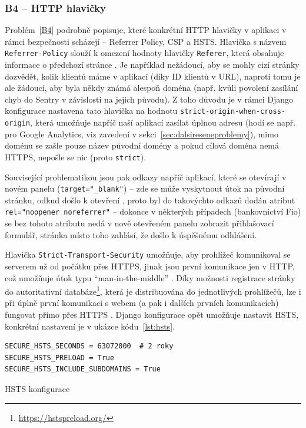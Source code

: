 \subsubsection{B4 -- HTTP hlavičky}

Problém~\ref{B4} podrobně popisuje, které konkrétní HTTP hlavičky v aplikaci v rámci bezpečnosti scházejí -- Referrer Policy, CSP a HSTS. Hlavička s názvem \verb|Referrer-Policy| slouží k omezení hodnoty hlavičky \verb|Referer|, která obsahuje informace o předchozí stránce \cite{securityheaders-referer}. Je například nežádoucí, aby se mohly cizí stránky dozvědět, kolik klientů máme v aplikací (díky ID klientů v URL), naproti tomu je ale žádoucí, aby byla někdy známá alespoň doména (např. kvůli povolení zasílání chyb do Sentry v závislosti na jejich původu). Z toho důvodu je v rámci Django konfigurace nastavena tato hlavička na hodnotu \verb|strict-origin-when-cross-origin|, která umožňuje napříč naší aplikací zasílat úplnou adresu (hodí se např. pro Google Analytics, viz zavedení v sekci~\ref{sec:dalsireseneproblemy}), mimo doménu se zašle pouze název původní domény a pokud cílová doména nemá HTTPS, nepošle se nic (proto \verb|strict|). 

Související problematikou jsou pak odkazy napříč aplikací, které se otevírají v novém panelu (\verb|target="_blank"|) -- zde se může vyskytnout útok na původní stránku, odkud došlo k otevření \cite{noopener}, proto byl do takovýchto odkazů dodán atribut \verb|rel="noopener noreferrer"| -- dokonce v některých případech (bankovnictví Fio) se bez tohoto atributu nedá v nově otevřeném panelu zobrazit přihlašovací formulář, stránka místo toho zahlásí, že došlo k úspěšnému odhlášení.

Hlavička \verb|Strict-Transport-Security| umožňuje, aby prohlížeč komunikoval se serverem už od počátku přes HTTPS, jinak jsou první komunikace jen v HTTP, což umožňuje útok typu \enquote{man-in-the-middle} \cite{securityheaders-hsts}. Díky možnosti registrace stránky do autoritativní databáze\footnote{\url{https://hstspreload.org/}}, která je distribuována do jednotlivých prohlížečů, lze i při úplně první komunikaci s webem (a pak i dalších prvních komunikacích) fungovat přímo přes HTTPS \cite{jakpsatweb-hsts}. Django konfigurace opět umožňuje nastavit HSTS, konkrétní nastavení je v ukázce kódu~\ref{lst:hsts}.

\begin{listing}[ht]
	\begin{verbatim}
SECURE_HSTS_SECONDS = 63072000  # 2 roky
SECURE_HSTS_PRELOAD = True
SECURE_HSTS_INCLUDE_SUBDOMAINS = True
	\end{verbatim}
	\caption{HSTS konfigurace}\label{lst:hsts}
\end{listing}

